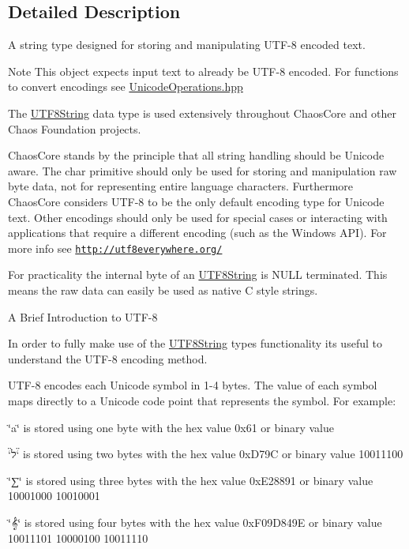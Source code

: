 \subsection{Detailed Description}
A string type designed for storing and manipulating U\+T\+F-\/8 encoded text. 

\begin{DoxyNote}{Note}
This object expects input text to already be U\+T\+F-\/8 encoded. For functions to convert encodings see \hyperlink{_unicode_operations_8hpp}{Unicode\+Operations.\+hpp}
\end{DoxyNote}
The \hyperlink{classchaos_1_1uni_1_1_u_t_f8_string}{U\+T\+F8\+String} data type is used extensively throughout Chaos\+Core and other Chaos Foundation projects.

Chaos\+Core stands by the principle that all string handling should be Unicode aware. The {\ttfamily char} primitive should only be used for storing and manipulation raw byte data, not for representing entire language characters. Furthermore Chaos\+Core considers U\+T\+F-\/8 to be the only default encoding type for Unicode text. Other encodings should only be used for special cases or interacting with applications that require a different encoding (such as the Windows A\+P\+I). For more info see \href{http://utf8everywhere.org/}{\tt http\+://utf8everywhere.\+org/}

For practicality the internal byte of an \hyperlink{classchaos_1_1uni_1_1_u_t_f8_string}{U\+T\+F8\+String} is N\+U\+L\+L terminated. This means the raw data can easily be used as native C style strings.

\begin{DoxyParagraph}{A Brief Introduction to U\+T\+F-\/8}

\end{DoxyParagraph}
In order to fully make use of the \hyperlink{classchaos_1_1uni_1_1_u_t_f8_string}{U\+T\+F8\+String} type\textquotesingle{}s functionality its useful to understand the U\+T\+F-\/8 encoding method.

U\+T\+F-\/8 encodes each Unicode symbol in 1-\/4 bytes. The value of each symbol maps directly to a Unicode code point that represents the symbol. For example\+:


\begin{DoxyItemize}
\item \char`\"{}a\char`\"{} is stored using one byte with the hex value 0x61 or binary value {}
\item \char`\"{}ל\char`\"{} is stored using two bytes with the hex value 0x\+D79\+C or binary value { 10011100}
\item \char`\"{}∑\char`\"{} is stored using three bytes with the hex value 0x\+E28891 or binary value { 10001000 10010001}
\item \char`\"{}𝄞\char`\"{} is stored using four bytes with the hex value 0x\+F09\+D849\+E or binary value { 10011101 10000100 10011110}
\end{DoxyItemize}

